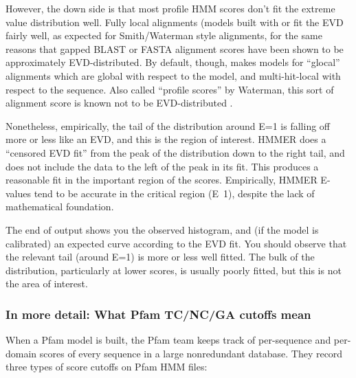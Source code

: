 However, the down side is that most profile HMM scores don't fit the
extreme value distribution well. Fully local alignments (models built
with  or  fit the EVD fairly well,
as expected for Smith/Waterman style alignments, for the same reasons
that gapped BLAST or FASTA alignment scores have been shown to be
approximately EVD-distributed. By default, though, 
makes models for ``glocal'' alignments which are global with respect
to the model, and multi-hit-local with respect to the sequence.  Also
called ``profile scores'' by Waterman, this sort of alignment score is
known not to be EVD-distributed \cite{GoldsteinWaterman94}.

Nonetheless, empirically, the tail of the distribution around E=1 is
falling off more or less like an EVD, and this is the region of
interest. HMMER does a ``censored EVD fit'' from the peak of the
distribution down to the right tail, and does not include the data to
the left of the peak in its fit. This produces a reasonable fit in the
important region of the scores. Empirically, HMMER E-values tend to be
accurate in the critical region (E~1), despite the lack of
mathematical foundation.

The end of  output shows you the observed histogram,
and (if the model is calibrated) an expected curve according to the
EVD fit. You should observe that the relevant tail (around E=1) is
more or less well fitted. The bulk of the distribution, particularly
at lower scores, is usually poorly fitted, but this is not the area of
interest.

\subsubsection{In more detail: What Pfam TC/NC/GA cutoffs mean}

When a Pfam model is built, the Pfam team keeps track of per-sequence
and per-domain scores of every sequence in a large nonredundant
database. They record three types of score cutoffs on Pfam HMM files:

